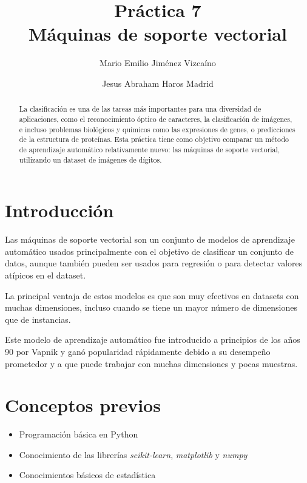 \documentclass[sigconf,authorversion,nonacm]{acmart}
\begin{document}
\title{Práctica 7 \\ Máquinas de soporte vectorial}

\author{Mario Emilio Jiménez Vizcaíno}

\author{Jesus Abraham Haros Madrid}


\begin{abstract}
  La clasificación es una de las tareas más importantes para una diversidad de aplicaciones, como el reconocimiento óptico de caracteres, la clasificación de imágenes, e incluso problemas biológicos y químicos como las expresiones de genes, o predicciones de la estructura de proteínas\cite{durgesh2010data}. Esta práctica tiene como objetivo comparar un método de aprendizaje automático relativamente nuevo: las máquinas de soporte vectorial, utilizando un dataset de imágenes de dígitos.
\end{abstract}

\maketitle

\section{Introducción}
Las máquinas de soporte vectorial son un conjunto de modelos de aprendizaje automático usados principalmente con el objetivo de clasificar un conjunto de datos, aunque también pueden ser usados para regresión o para detectar valores atípicos en el dataset.

La principal ventaja de estos modelos es que son muy efectivos en datasets con muchas dimensiones, incluso cuando se tiene un mayor número de dimensiones que de instancias\cite{scikit-learn}.

Este modelo de aprendizaje automático fue introducido a principios de los años 90 por Vapnik\cite{cortes1995support} y ganó popularidad rápidamente debido a su desempeño prometedor y a que puede trabajar con muchas dimensiones y pocas muestras.

\section{Conceptos previos}
\begin{itemize}
  \item Programación básica en Python
  \item Conocimiento de las librerías \textit{scikit-learn}, \textit{matplotlib} y \textit{numpy}
  \item Conocimientos básicos de estadística
\end{itemize}
\end{document}

